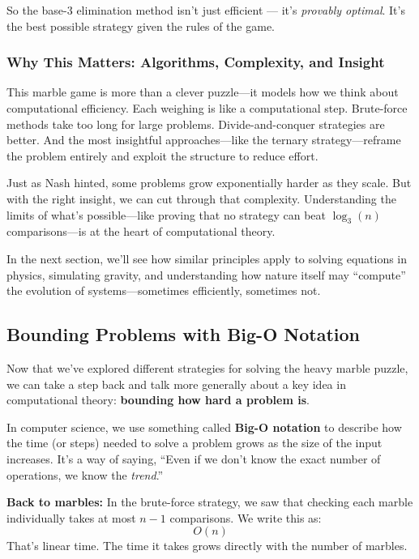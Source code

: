 So the base-3 elimination method isn’t just efficient — it’s \textit{provably optimal}. It’s the best possible strategy given the rules of the game.





\subsubsection{Why This Matters: Algorithms, Complexity, and Insight}

This marble game is more than a clever puzzle—it models how we think about computational efficiency. Each weighing is like a computational step. Brute-force methods take too long for large problems. Divide-and-conquer strategies are better. And the most insightful approaches—like the ternary strategy—reframe the problem entirely and exploit the structure to reduce effort.

Just as Nash hinted, some problems grow exponentially harder as they scale. But with the right insight, we can cut through that complexity. Understanding the limits of what’s possible—like proving that no strategy can beat \( \log_3(n) \) comparisons—is at the heart of computational theory.

In the next section, we’ll see how similar principles apply to solving equations in physics, simulating gravity, and understanding how nature itself may ``compute'' the evolution of systems—sometimes efficiently, sometimes not.



\subsection{Bounding Problems with Big-O Notation}

Now that we’ve explored different strategies for solving the heavy marble puzzle, we can take a step back and talk more generally about a key idea in computational theory: \textbf{bounding how hard a problem is}.

In computer science, we use something called \textbf{Big-O notation} to describe how the time (or steps) needed to solve a problem grows as the size of the input increases. It’s a way of saying, “Even if we don’t know the exact number of operations, we know the \emph{trend}.”

\medskip

\noindent\textbf{Back to marbles:} In the brute-force strategy, we saw that checking each marble individually takes at most \( n - 1 \) comparisons. We write this as:
\[
O(n)
\]
That’s linear time. The time it takes grows directly with the number of marbles.


